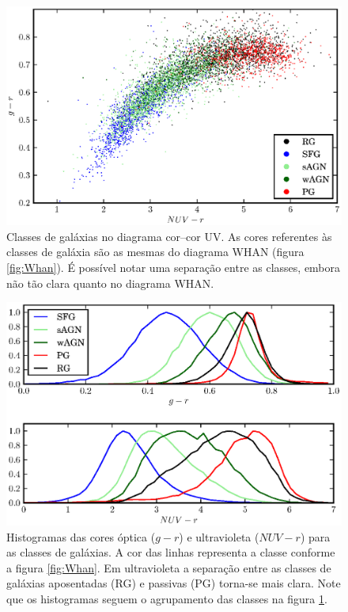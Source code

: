 \begin{figure}
	\includegraphics{figuras/uvcolor-color-class.eps}
	\caption[Diagrama cor--cor UV de acordo com o tipo de galáxia.]
	{Classes de galáxias no diagrama cor--cor UV. As cores referentes às classes de
	galáxia são as mesmas do diagrama WHAN (figura \ref{fig:Whan}). É possível
	notar uma separação entre as classes, embora não tão clara quanto no diagrama
	WHAN.}
	\label{fig:ColorClass}
\end{figure}

\begin{figure}
	\includegraphics{figuras/histo_galtype_color.eps}
	\caption[Histogramas de cores para as classes de galáxias.]
	{Histogramas das cores óptica ($g-r$) e ultravioleta ($NUV-r$) para as
	classes de galáxias. A cor das linhas representa a classe conforme a figura
	\ref{fig:Whan}. Em ultravioleta a separação entre as classes de galáxias
	aposentadas (RG) e passivas (PG) torna-se mais clara. Note que os histogramas
	seguem o agrupamento das classes na figura \ref{fig:ColorClass}.}
	\label{fig:HistogramaCorClasse}
\end{figure}

